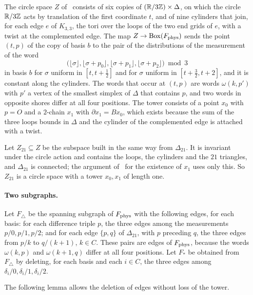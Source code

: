 The circle space $Z$ of~\cite[Appendix~E]{Z} consists of six copies of $(\mathbb R/3\mathbb Z)\times\Delta$, on which the circle $\mathbb R/3\mathbb Z$ acts by translation of the first coordinate $t$, and of nine cylinders that join, for each edge $e$ of $K_{3,3}$, the tori over the loops of the two end grids of $e$, with a twist at the complemented edge. The map $Z\to\operatorname{Box}(F_{\rm phys})$ sends the point $(t,p)$ of the copy of basis $b$ to the pair of the distributions of the measurement of the word
\[
 \bigl(\lfloor\sigma\rfloor,\lfloor\sigma+p_0\rfloor,\lfloor\sigma+p_1\rfloor,\lfloor\sigma+p_2\rfloor\bigr)\bmod3
\]
in basis $b$ for $\sigma$ uniform in $[t,t+\frac12]$ and for $\sigma$ uniform in $[t+\frac32,t+2]$, and it is constant along the cylinders. The words that occur at $(t,p)$ are words $\omega(k,p')$ with $p'$ a vertex of the smallest simplex of $\Delta$ that contains $p$, and two words in opposite shores differ at all four positions. The tower consists of a point $x_0$ with $p=O$ and a $2$-chain $x_1$ with $\partial x_1=Bx_0$, which exists because the sum of the three loops bounds in $\Delta$ and the cylinder of the complemented edge is attached with a twist.

Let $Z_{21}\subseteq Z$ be the subspace built in the same way from $\Delta_{21}$. It is invariant under the circle action and contains the loops, the cylinders and the $21$ triangles, and $\Delta_{21}$ is connected; the argument of~\cite[Appendix~E]{Z} for the existence of $x_1$ uses only this. So $Z_{21}$ is a circle space with a tower $x_0,x_1$ of length one.

\paragraph{Two subgraphs.}
Let $F_\triangle$ be the spanning subgraph of $F_{\rm phys}$ with the following edges, for each basis: for each difference triple $p$, the three edges among the measurements $p/0,p/1,p/2$; and for each edge $\{p,q\}$ of $\Delta_{21}$, with $p$ preceding $q$, the three edges from $p/k$ to $q/(k+1)$, $k\in C$. These pairs are edges of $F_{\rm phys}$, because the words $\omega(k,p)$ and $\omega(k+1,q)$ differ at all four positions. Let $F_*$ be obtained from $F_\triangle$ by deleting, for each basis and each $i\in C$, the three edges among $\delta_i/0,\delta_i/1,\delta_i/2$.

The following lemma allows the deletion of edges without loss of the tower.

